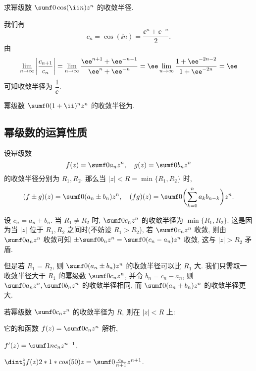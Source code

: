 \begin{example}
  求幂级数 $\sumf0 \cos(\ii n)z^n$ 的收敛半径.
\end{example}

\begin{solution}
  我们有
  \[
    c_n=\cos(\ii n)=\dfrac{\ee^n+\ee^{-n}}2.
  \]
  由
  \[
     \lim_{n\ra\infty}\abs{\frac{c_{n+1}}{c_n}}
    =\lim_{n\ra\infty}\frac{\ee^{n+1}+\ee^{-n-1}}{\ee^n+\ee^{-n}}
    =\ee\lim_{n\ra\infty}\frac{1+\ee^{-2n-2}}{1+\ee^{-2n}}
    =\ee
  \]
  可知收敛半径为 $\dfrac1\ee$.
\end{solution}

\begin{exercise}
  幂级数 $\sumf0 (1+\ii)^nz^n$ 的收敛半径为\fillblank[2cm]{}.
\end{exercise}


\subsection{幂级数的运算性质}

\begin{theorem}
  设幂级数
  \[
    f(z)=\sumf0 a_nz^n,\quad
    g(z)=\sumf0 b_nz^n
  \]
  的收敛半径分别为 $R_1,R_2$.
  那么当 $|z|<R=\min\{R_1,R_2\}$ 时,
  \[
    (f\pm g)(z)=\sumf0 (a_n\pm b_n)z^n,\quad
    (fg)(z)=\sumf0 \biggl(\sum_{k=0}^na_kb_{n-k}\biggr)z^n.
  \]
\end{theorem}

设 $c_n=a_n+b_n$.
当 $R_1\neq R_2$ 时, $\sumf0 c_n z^n$ 的收敛半径为 $\min\{R_1,R_2\}$.
这是因为当 $|z|$ 位于 $R_1,R_2$ 之间时(不妨设 $R_1>R_2$), 若 $\sumf0 c_n z^n$ 收敛, 则由 $\sumf0 a_n z^n$ 收敛可知   $\pm\sumf0 b_n z^n=\sumf0 (c_n-a_n) z^n$ 收敛, 这与 $|z|>R_2$ 矛盾.

但是若 $R_1=R_2$, 则 $\sumf0 (a_n\pm b_n)z^n$ 的收敛半径可以比 $R_1$ 大. 我们只需取一收敛半径大于 $R_1$ 的幂级数 $\sumf0 c_nz^n$, 并令 $b_n=c_n-a_n$, 则 $\sumf0 a_nz^n,\sumf0 b_nz^n$ 的收敛半径相同, 而 $\sumf0 (a_n+b_n)z^n$ 的收敛半径更大.

\begin{theorem}
  若幂级数 $\sumf0 c_nz^n$ 的收敛半径为 $R$, 则在 $|z|<R$ 上:
  \begin{enuma}
    \item 它的和函数 $f(z)=\sumf0 c_nz^n$ 解析,
    \item $f'(z)=\sumf1 nc_nz^{n-1}$,
    \item $\dint_0^zf(z)\d z=\sumf0 \frac{c_n}{n+1}z^{n+1}$.
  \end{enuma}
\end{theorem}

